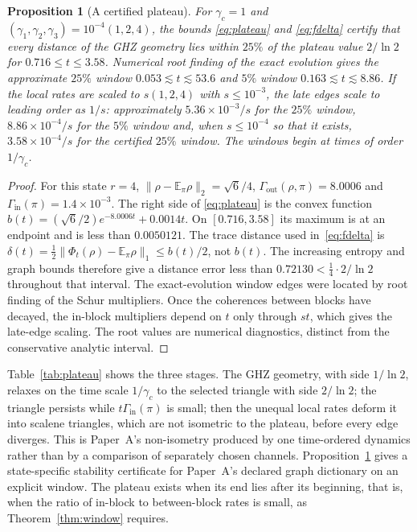 \documentclass[12pt,a4paper]{article}
\newtheorem{proposition}[theorem]{Proposition}
\newcommand{\E}{\mathbb E}
\newcommand{\Gin}{\Gamma_{\mathrm{in}}}
\newcommand{\Gout}{\Gamma_{\mathrm{out}}}
\begin{document}
\begin{proposition}[A certified plateau]
\label{prop:plateau}
For $\gamma_c=1$ and $(\gamma_1,\gamma_2,\gamma_3)=10^{-4}(1,2,4)$, the bounds \eqref{eq:plateau} and \eqref{eq:fdelta} certify that every distance of the GHZ geometry lies within $25\%$ of the plateau value $2/\ln2$ for $0.716\le t\le3.58$. Numerical root finding of the exact evolution gives the approximate $25\%$ window $0.053\lesssim t\lesssim53.6$ and $5\%$ window $0.163\lesssim t\lesssim8.86$. If the local rates are scaled to $s(1,2,4)$ with $s\le10^{-3}$, the late edges scale to leading order as $1/s$: approximately $5.36\times10^{-3}/s$ for the $25\%$ window, $8.86\times10^{-4}/s$ for the $5\%$ window and, when $s\le10^{-4}$ so that it exists, $3.58\times10^{-4}/s$ for the certified $25\%$ window. The windows begin at times of order $1/\gamma_c$.
\end{proposition}

\begin{proof}
For this state $r=4$, $\|\rho-\E_\pi\rho\|_2=\sqrt6/4$, $\Gout(\rho,\pi)=8.0006$ and $\Gin(\pi)=1.4\times10^{-3}$. The right side of \eqref{eq:plateau} is the convex function $b(t)=(\sqrt6/2)e^{-8.0006t}+0.0014t$. On $[0.716,3.58]$ its maximum is at an endpoint and is less than $0.0050121$. The trace distance used in~\eqref{eq:fdelta} is
$\delta(t)=\tfrac12\|\Phi_t(\rho)-\E_\pi\rho\|_1\le b(t)/2$,
not $b(t)$. The increasing entropy and graph bounds therefore give a distance error less than $0.72130<\frac14\cdot2/\ln2$ throughout that interval. The exact-evolution window edges were located by root finding of the Schur multipliers. Once the coherences between blocks have decayed, the in-block multipliers depend on $t$ only through $st$, which gives the late-edge scaling. The root values are numerical diagnostics, distinct from the conservative analytic interval.
\end{proof}

Table~\ref{tab:plateau} shows the three stages. The GHZ geometry, with side $1/\ln2$, relaxes on the time scale $1/\gamma_c$ to the selected triangle with side $2/\ln2$; the triangle persists while $t\Gin(\pi)$ is small; then the unequal local rates deform it into scalene triangles, which are not isometric to the plateau, before every edge diverges. This is Paper~A's non-isometry produced by one time-ordered dynamics rather than by a comparison of separately chosen channels. Proposition~\ref{prop:plateau} gives a state-specific stability certificate for Paper~A's declared graph dictionary on an explicit window. The plateau exists when its end lies after its beginning, that is, when the ratio of in-block to between-block rates is small, as Theorem~\ref{thm:window} requires.
\end{document}
